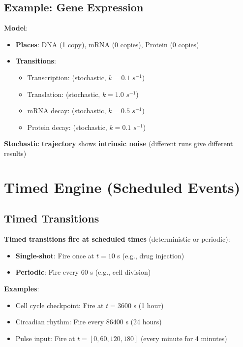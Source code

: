\subsection{Example: Gene Expression}
\label{subsec:gene-expression-example}

\textbf{Model}:

\begin{itemize}
    \item \textbf{Places}: DNA (1 copy), mRNA (0 copies), Protein (0 copies)
    \item \textbf{Transitions}:
    \begin{itemize}
        \item Transcription:  (stochastic, $k=0.1$ $s^{-1}$)
        \item Translation:  (stochastic, $k=1.0$ $s^{-1}$)
        \item mRNA decay:  (stochastic, $k=0.5$ $s^{-1}$)
        \item Protein decay:  (stochastic, $k=0.1$ $s^{-1}$)
    \end{itemize}
\end{itemize}

\textbf{Stochastic trajectory} shows \textbf{intrinsic noise} (different runs give different results)

\section{Timed Engine (Scheduled Events)}
\label{sec:timed-engine}

\subsection{Timed Transitions}
\label{subsec:timed-transitions}

\textbf{Timed transitions fire at scheduled times} (deterministic or periodic):

\begin{itemize}
    \item \textbf{Single-shot}: Fire once at $t=10$ s (e.g., drug injection)
    \item \textbf{Periodic}: Fire every 60 s (e.g., cell division)
\end{itemize}

\textbf{Examples}:

\begin{itemize}
    \item Cell cycle checkpoint: Fire at $t=3600$ s (1 hour)
    \item Circadian rhythm: Fire every 86400 s (24 hours)
    \item Pulse input: Fire at $t=[0, 60, 120, 180]$ (every minute for 4 minutes)
\end{itemize}

